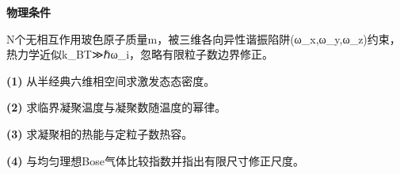 \textbf{物理条件}\par N个无相互作用玻色原子质量m，被三维各向异性谐振陷阱(ω\_x,ω\_y,ω\_z)约束，热力学近似k\_BT≫ℏω\_i，忽略有限粒子数边界修正。
\par\noindent\textbf{(1)} 从半经典六维相空间求激发态态密度。
\par\noindent\textbf{(2)} 求临界凝聚温度与凝聚数随温度的幂律。
\par\noindent\textbf{(3)} 求凝聚相的热能与定粒子数热容。
\par\noindent\textbf{(4)} 与均匀理想Bose气体比较指数并指出有限尺寸修正尺度。
